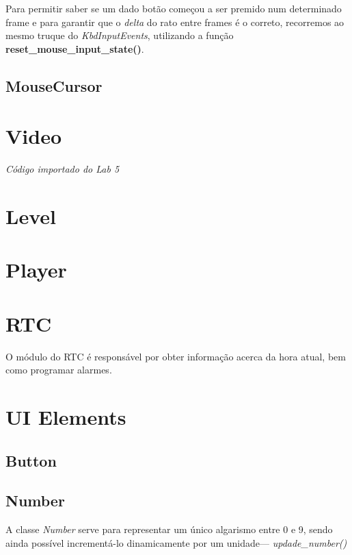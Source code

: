 \documentclass{report}
\begin{document}
Para permitir saber se um dado botão começou a ser premido num determinado frame e para garantir que o \textit{delta} do rato entre frames é o correto, recorremos ao mesmo truque do \textit{KbdInputEvents}, utilizando a função \textbf{reset\_mouse\_input\_state()}.

\subsection{MouseCursor}

\paragraph{}

\section{Video}

\textit{Código importado do Lab 5}\footnotemark[\value{footnote}]

\section{Level}

\section{Player}

\section{RTC}

O módulo do RTC é responsável por obter informação acerca da hora atual, bem como programar alarmes.

\section{UI Elements}

\subsection{Button}

\subsection{Number}

A classe \textit{Number} serve para representar um único algarismo entre 0 e 9, sendo ainda possível incrementá-lo dinamicamente por um unidade\footnotemark --- \textit{updade\_number()}
\end{document}
